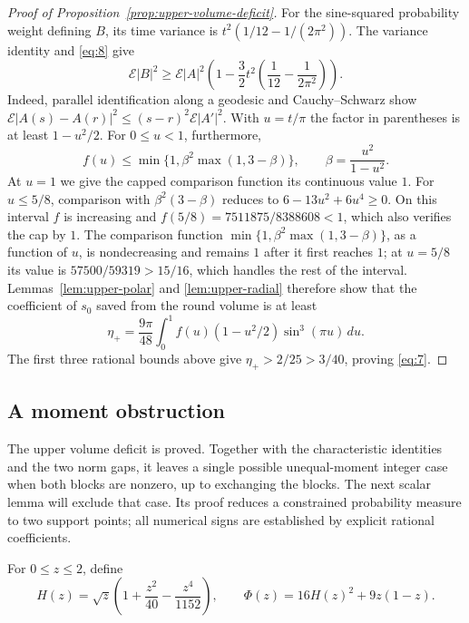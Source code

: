 \begin{proof}[Proof of Proposition~\ref{prop:upper-volume-deficit}]
For the sine-squared probability weight defining $B$, its time variance
is $t^2(1/12-1/(2\pi^2))$.  The variance identity and \eqref{eq:8} give
\[
 \mathcal E|B|^2\ge\mathcal E|A|^2
 \left(1-\frac32t^2\left(\frac1{12}-\frac1{2\pi^2}\right)\right).
\]
Indeed, parallel identification along a geodesic and Cauchy--Schwarz
show
$\mathcal E|A(s)-A(r)|^2\le(s-r)^2\mathcal E|A'|^2$.
With $u=t/\pi$ the factor in parentheses is at least $1-u^2/2$.
For $0\le u<1$, furthermore,
\[
 f(u)\le\min\{1,\beta^2\max(1,3-\beta)\},\qquad
 \beta=\frac{u^2}{1-u^2}.
\]
At $u=1$ we give the capped comparison function its continuous value $1$.
For $u\le5/8$, comparison with $\beta^2(3-\beta)$ reduces to
$6-13u^2+6u^4\ge0$. On this interval $f$ is increasing and
$f(5/8)=7511875/8388608<1$, which also verifies the cap by $1$.  The comparison function $\min\{1,\beta^2\max(1,3-\beta)\}$, as a function of $u$, is nondecreasing and remains $1$ after it first reaches $1$; at $u=5/8$ its value is
$57500/59319>15/16$, which handles the rest of the interval.
Lemmas~\ref{lem:upper-polar} and \ref{lem:upper-radial} therefore show
that the coefficient of $s_0$ saved from the round volume is at least
\[
 \eta_+=\frac{9\pi}{48}\int_0^1
 f(u)(1-u^2/2)\sin^3(\pi u)\,du.
\]
The first three rational bounds above give $\eta_+>2/25>3/40$, proving
\eqref{eq:7}.

\end{proof}

\subsection{A moment obstruction}

The upper volume deficit is proved. Together with the characteristic
identities and the two norm gaps, it leaves a single
possible unequal-moment integer case when both blocks are nonzero, up to
exchanging the blocks. The next scalar lemma
will exclude that case. Its proof reduces a constrained probability
measure to two support points; all numerical signs are established by
explicit rational coefficients.

For $0\le z\le2$, define
\[
 H(z)=\sqrt z\left(1+\frac{z^2}{40}-\frac{z^4}{1152}\right),\qquad
 \Phi(z)=16H(z)^2+9z(1-z).
\]

